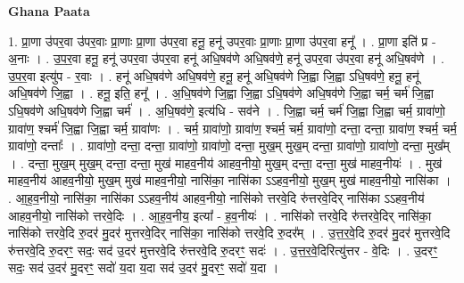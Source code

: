 \documentclass[17pt]{extarticle}
\begin{document}
\textbf{Ghana Paata } \newline

1. प्रा॒णा उ॑पर॒वा उ॑पर॒वाः प्रा॒णाः प्रा॒णा उ॑पर॒वा हनू॒ हनू॑ उपर॒वाः प्रा॒णाः प्रा॒णा उ॑पर॒वा हनू᳚ । . प्रा॒णा इति॑ प्र - अ॒नाः । . उ॒प॒र॒वा हनू॒ हनू॑ उपर॒वा उ॑पर॒वा हनू॑ अधि॒षव॑णे अधि॒षव॑णे॒ हनू॑ उपर॒वा उ॑पर॒वा हनू॑ अधि॒षव॑णे । . उ॒प॒र॒वा इत्यु॑प - र॒वाः । . हनू॑ अधि॒षव॑णे अधि॒षव॑णे॒ हनू॒ हनू॑ अधि॒षव॑णे जि॒ह्वा जि॒ह्वा ऽधि॒षव॑णे॒ हनू॒ हनू॑ अधि॒षव॑णे जि॒ह्वा । . हनू॒ इति॒ हनू᳚ । . अ॒धि॒षव॑णे जि॒ह्वा जि॒ह्वा ऽधि॒षव॑णे अधि॒षव॑णे जि॒ह्वा चर्म॒ चर्म॑ जि॒ह्वा ऽधि॒षव॑णे अधि॒षव॑णे जि॒ह्वा चर्म॑ । . अ॒धि॒षव॑णे॒ इत्य॑धि - सव॑ने । . जि॒ह्वा चर्म॒ चर्म॑ जि॒ह्वा जि॒ह्वा चर्म॒ ग्रावा॑णो॒ ग्रावा॑ण॒ श्चर्म॑ जि॒ह्वा जि॒ह्वा चर्म॒ ग्रावा॑णः । . चर्म॒ ग्रावा॑णो॒ ग्रावा॑ण॒ श्चर्म॒ चर्म॒ ग्रावा॑णो॒ दन्ता॒ दन्ता॒ ग्रावा॑ण॒ श्चर्म॒ चर्म॒ ग्रावा॑णो॒ दन्ताः᳚ । . ग्रावा॑णो॒ दन्ता॒ दन्ता॒ ग्रावा॑णो॒ ग्रावा॑णो॒ दन्ता॒ मुख॒म् मुख॒म् दन्ता॒ ग्रावा॑णो॒ ग्रावा॑णो॒ दन्ता॒ मुख᳚म् । . दन्ता॒ मुख॒म् मुख॒म् दन्ता॒ दन्ता॒ मुख॑ माहव॒नीय॑ आहव॒नीयो॒ मुख॒म् दन्ता॒ दन्ता॒ मुख॑ माहव॒नीयः॑ । . मुख॑ माहव॒नीय॑ आहव॒नीयो॒ मुख॒म् मुख॑ माहव॒नीयो॒ नासि॑का॒ नासि॑का ऽऽहव॒नीयो॒ मुख॒म् मुख॑ माहव॒नीयो॒ नासि॑का । . आ॒ह॒व॒नीयो॒ नासि॑का॒ नासि॑का ऽऽहव॒नीय॑ आहव॒नीयो॒ नासि॑को त्तरवे॒दि रु॑त्तरवे॒दिर् नासि॑का ऽऽहव॒नीय॑ आहव॒नीयो॒ नासि॑को त्तरवे॒दिः । . आ॒ह॒व॒नीय॒ इत्या᳚ - ह॒व॒नीयः॑ । . नासि॑को त्तरवे॒दि रु॑त्तरवे॒दिर् नासि॑का॒ नासि॑को त्तरवे॒दि रु॒दर॑ मु॒दर॑ मुत्तरवे॒दिर् नासि॑का॒ नासि॑को त्तरवे॒दि रु॒दर᳚म् । . उ॒त्त॒र॒वे॒दि रु॒दर॑ मु॒दर॑ मुत्तरवे॒दि रु॑त्तरवे॒दि रु॒दरꣳ॒॒ सदः॒ सद॑ उ॒दर॑ मुत्तरवे॒दि रु॑त्तरवे॒दि रु॒दरꣳ॒॒ सदः॑ । . उ॒त्त॒र॒वे॒दिरित्यु॑त्तर - वे॒दिः । . उ॒दरꣳ॒॒ सदः॒ सद॑ उ॒दर॑ मु॒दरꣳ॒॒ सदो॑ य॒दा य॒दा सद॑ उ॒दर॑ मु॒दरꣳ॒॒ सदो॑ य॒दा । \newline
\end{document}
